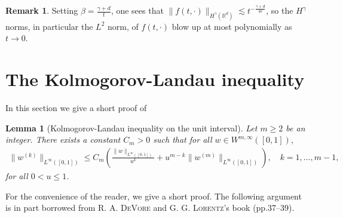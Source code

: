 \documentclass[11pt,a4paper,reqno]{amsart}
\theoremstyle{plain}
\newtheorem{lemma}[proposition]{Lemma}
\theoremstyle{definition}
\newtheorem{remark}[proposition]{Remark}
\begin{document}
\begin{remark}
	Setting $\beta=\frac{\gamma+d}{t}$, one sees that $\|f(t, \cdot)\|_{H^{\gamma}({\mathbb{R}}^d)} \lesssim t^{-\frac{\gamma+d}{4\nu}}$, so the $H^{\gamma}$ norms, in particular the $L^2$ norm, of $f(t, \cdot)$ blow up at most polynomially as $t\to 0$.
\end{remark}

\section{The Kolmogorov-Landau inequality}\label{sec:app-landau}
In this section we give a short proof of
\begin{lemma}[Kolmogorov-Landau inequality on the unit interval]\label{lem:landau-app}
	Let $m\geq 2$ be an integer. There exists a constant $C_m>0$ such that for all $w\in W^{m, \infty}([0,1])$,
	\begin{align*}
		\|w^{(k)}\|_{L^{\infty}([0,1])} \leq C_m \left( \frac{\|w\|_{L^{\infty}([0,1])}}{u^k} + u^{m-k} \|w^{(m)}\|_{L^{\infty}([0,1])} \right), \quad k=1, \dots, m-1,
	\end{align*}
	for all $0< u \leq 1$.
\end{lemma}
For the convenience of the reader, we give a short proof. The following argument is in part borrowed from \textsc{R. A. DeVore} and \textsc{G. G. Lorentz}'s book \cite{DL93} (pp.37--39).
\end{document}
